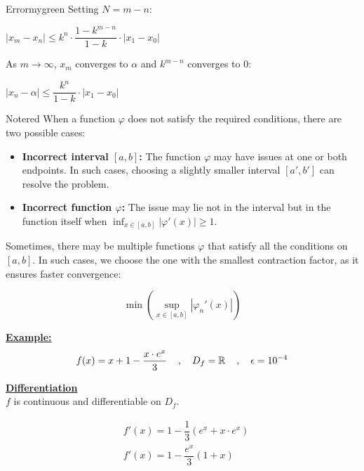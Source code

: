\begin{prettyBox}{Error}{mygreen}
Setting \(N = m-n\):

\begin{center}
    \(|x_m - x_n| \leq k^{n} \cdot \dfrac{1-k^{m-n}}{1-k} \cdot| x_{1} - x_0|\)
\end{center}

As \(m \to \infty\), \(x_m\) converges to \(\alpha\) and \(k^{m-n}\) converges to 0:

\begin{center}
    \(\boxed{|x_n - \alpha| \leq \dfrac{k^n}{1-k} \cdot| x_{1} - x_0|}\)
\end{center}
\end{prettyBox}

\newpage

\begin{prettyBox}{Note}{red}
When a function \(\varphi\) does not satisfy the required conditions, there are two possible cases:  
\begin{itemize}
    \item \textbf{Incorrect interval \([a, b]\):} The function \(\varphi\) may have issues at one or both endpoints. In such cases, choosing a slightly smaller interval \([a', b']\) can resolve the problem.  
    \item \textbf{Incorrect function \(\varphi\):} The issue may lie not in the interval but in the function itself when \(\displaystyle\inf_{x \in [a, b]} |\varphi'(x)| \geq 1\).  
\end{itemize}


Sometimes, there may be multiple functions \(\varphi\) that satisfy all the conditions on \([a, b]\). In such cases, we choose the one with the smallest contraction factor, as it ensures faster convergence:  

\[
\min \left( \sup_{x \in [a, b]} |\varphi_n'(x)| \right)
\]
\end{prettyBox}

\vspace{0.75cm}

\textbf{\underline{Example:}}
\[
f(x) = x + 1 - \frac{x\cdot e^{x}}{3} \hspace{0.4cm}, \quad D_f = \mathbb{R} \hspace{0.4cm}, \quad \epsilon = 10^{-4}\]

\vspace{0.5cm}
\textbf{\underline{Differentiation}}\\[0.2cm]
\( f \) is continuous and differentiable on \( D_f \).

\begin{center}
    \begin{align*}
        &f'(x) = 1 - \dfrac{1}{3}(e^{x}+x\cdot e^{x})\\[0.1cm] 
        &\boxed{f'(x) = 1 - \dfrac{e^{x}}{3}(1+x)}
    \end{align*}
\end{center}

